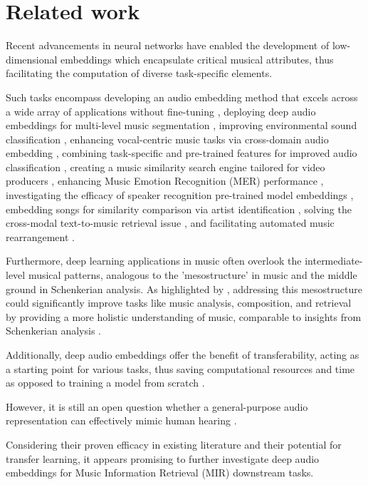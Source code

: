 \section{Related work}

Recent advancements in neural networks have enabled the development of low-dimensional embeddings which encapsulate critical musical attributes, thus facilitating the computation of diverse task-specific elements. 

Such tasks encompass developing an audio embedding method that excels across a wide array of applications without fine-tuning \cite{Turian2022HEAR:Representations}, deploying deep audio embeddings for multi-level music segmentation \cite{SalamonDeepSegmentation}, improving environmental sound classification \cite{Kim2020OneStrategies}, enhancing vocal-centric music tasks via cross-domain audio embedding \cite{Kim2021LearningLoss}, combining task-specific and pre-trained features for improved audio classification \cite{Hung2022Feature-informedClassification}, creating a music similarity search engine tailored for video producers \cite{epidemic}, enhancing Music Emotion Recognition (MER) performance \cite{KohComparisonRecognition}, investigating the efficacy of speaker recognition pre-trained model embeddings \cite{lightweight}, embedding songs for similarity comparison via artist identification \cite{contentmusicsimtriplet2020}, solving the cross-modal text-to-music retrieval issue \cite{WonEmotionStories}, and facilitating automated music rearrangement \cite{Stoller2018IntuitiveTransitions, Plachouras2023MusicSegmentation}.

Furthermore, deep learning applications in music often overlook the intermediate-level musical patterns, analogous to the 'mesostructure' in music and the middle ground in Schenkerian analysis. As highlighted by \cite{Mesostructures2023}, addressing this mesostructure could significantly improve tasks like music analysis, composition, and retrieval by providing a more holistic understanding of music, comparable to insights from Schenkerian analysis \cite{Introduction_to_Schenkerian_Analysis}.

Additionally, deep audio embeddings offer the benefit of transferability, acting as a starting point for various tasks, thus saving computational resources and time as opposed to training a model from scratch \cite{HamelTransferSimilarity}.

However, it is still an open question whether a general-purpose audio representation can effectively mimic human hearing \cite{Turian2022HEAR:Representations}.

Considering their proven efficacy in existing literature and their potential for transfer learning, it appears promising to further investigate deep audio embeddings for Music Information Retrieval (MIR) downstream tasks.
